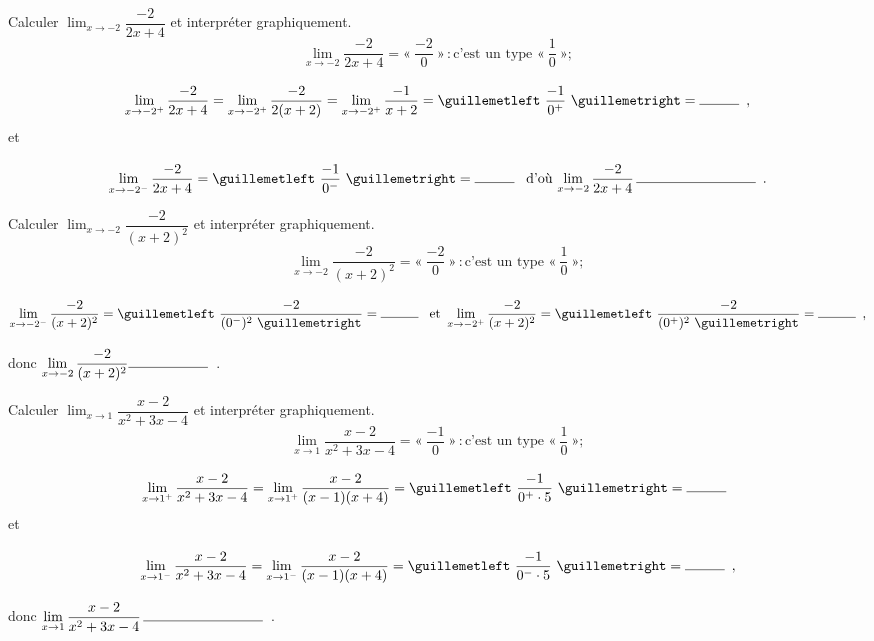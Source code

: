 \documentclass[a4paper,12pt]{article}
\begin{document}
\begin{exemple}[label=ex:inf1]
	\tcblower
Calculer  \(\displaystyle\lim_{x\to -2}\dfrac{-2}{2x+4}\) et interpréter graphiquement.
\[
\lim_{x\to -2}\dfrac{-2}{2x+4}
=«~\dfrac{-2}{0}~»
\,: \text{c'est un type }«~\dfrac{1}{0}~»;
\]
\[
\lim_{x\to -2^+}\dfrac{-2}{2x+4}
=\lim_{x\to -2^+}\dfrac{-2}{2(x+2)}
=\lim_{x\to -2^+}\dfrac{-1}{x+2}
=«~\dfrac{-1}{0^+}~»
=\ligne{1},
\]
et
\[
\lim_{x\to -2^-}\dfrac{-2}{2x+4}
=«~\dfrac{-1}{0^-}~»
=\ligne{1} \text{ d'où } \displaystyle{\lim_{x\to -2}\dfrac{-2}{2x+4}}\, \ligne{3}.\] 
\end{exemple}
\begin{exemple}[label=ex:inf2]
	Calculer  \(\displaystyle\lim_{x\to -2}\dfrac{-2}{(x+2)^2}\) et interpréter graphiquement.
	\tcblower
\[
\lim_{x\to -2}\dfrac{-2}{(x+2)^2}
=«~\dfrac{-2}{0}~»
\,: \text{c'est un type }«~\dfrac{1}{0}~»
;
\]
\[
\lim_{x\to -2^-}\dfrac{-2}{(x+2)^2}
=«~\dfrac{-2}{(0^-)^2~»
}
=\ligne{1} \text{ et } 
\lim_{x\to -2^+}\dfrac{-2}{(x+2)^2}
=«~\dfrac{-2}{(0^+)^2~»
}
=\ligne{1},
\]
donc $\displaystyle\lim_{x\to -2}\dfrac{-2}{(x+2)^2}\ligne{2}$.
\end{exemple}
\begin{exemple}[label=ex:inf3]
	Calculer \(\displaystyle\lim_{x\to 1}\dfrac{x-2}{x^2+3x-4}\) et interpréter graphiquement.
	\tcblower
\[
\lim_{x\to 1}\dfrac{x-2}{x^2+3x-4}
=«~\dfrac{-1}{0}~»
\,: \text{c'est un type }«~\dfrac{1}{0}~»
;
\]
\[
\lim_{x\to 1^+}\dfrac{x-2}{x^2+3x-4}
=\lim_{x\to 1^+}\dfrac{x-2}{(x-1)(x+4)}
=«~\dfrac{-1}{0^+\cdot5}~»
=\ligne{1}\]
et
\vspace{-0.3cm}
\[
\lim_{x\to 1^-}\dfrac{x-2}{x^2+3x-4}
=\lim_{x\to 1^-}\dfrac{x-2}{(x-1)(x+4)}
=«~\dfrac{-1}{0^-\cdot5}~»
=\ligne{1},
\]
donc $\displaystyle\lim_{x\to 1}\dfrac{x-2}{x^2+3x-4}\,\ligne{3}$.
\end{exemple}
\end{document}
